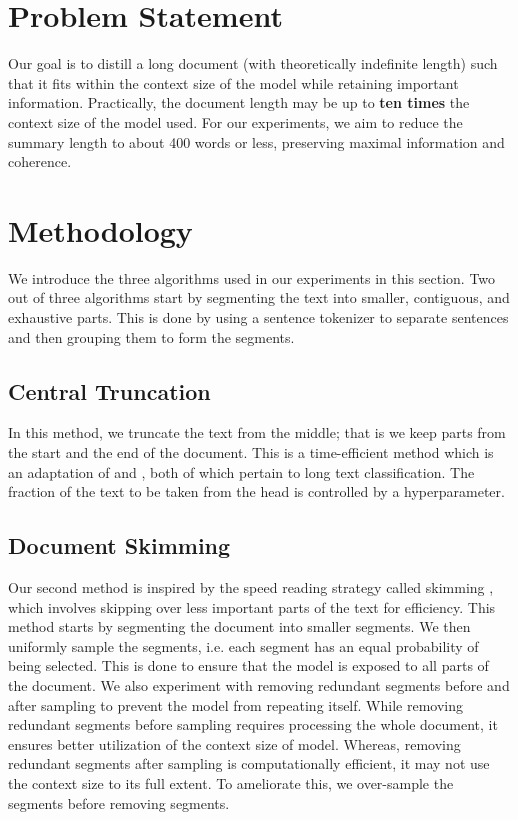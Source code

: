 \documentclass[letterpaper]{article} %
\begin{document}
\section{Problem Statement}

	Our goal is to distill a long document (with theoretically indefinite length) such
	that it fits within the context size of the model while retaining important information.
	Practically, the document length may be up to \textbf{ten times} the context size
	of the model used.
	For our experiments, we aim to reduce the summary length to about 400 words or less,
	preserving maximal information and coherence.


\section{Methodology}

	We introduce the three algorithms used in our experiments in this section.
	Two out of three algorithms start by segmenting the text into smaller, contiguous,
	and exhaustive parts.
	This is done by using a sentence tokenizer to separate sentences and then grouping
	them to form the segments.

	\subsection{Central Truncation}

		In this method, we truncate the text from the middle; that is we keep parts from the start
		and the end of the document.
		This is a time-efficient method which is an adaptation of \citet{worsham-kalita-2018-genre}
		and \citet{sun2019fine}, both of which pertain to long text classification.
		The fraction of the text to be taken from the head is controlled by a hyperparameter.

	\subsection{Document Skimming}

		Our second method is inspired by the speed reading strategy called skimming
		\cite{dhillon2020effect}, which involves skipping over less important parts of the text
		for efficiency.
		This method starts by segmenting the document into smaller segments.
		We then uniformly sample the segments, i.e. each segment has an equal probability
		of being selected.
		This is done to ensure that the model is exposed to all parts of the document.
		We also experiment with removing redundant segments before and after sampling to
		prevent the model from repeating itself.
		While removing redundant segments before sampling requires processing the whole
		document, it ensures better utilization of the context size of model.
		Whereas, removing redundant segments after sampling is computationally
		efficient, it may not use the context size to its full extent.
		To ameliorate this, we over-sample the segments before removing segments.
\end{document}
